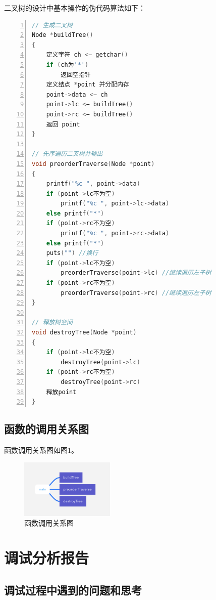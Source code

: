 \documentclass{article}
\begin{document}
二叉树的设计中基本操作的伪代码算法如下：

\begin{lstlisting}[language={C},
    numbers=left,
    numberstyle=\tiny\consolas,
    basicstyle=\small\consolas]
// 生成二叉树
Node *buildTree()
{
    定义字符 ch <− getchar()
    if (ch为'*')
        返回空指针
    定义结点 *point 并分配内存
    point->data <− ch
    point->lc <− buildTree()
    point->rc <− buildTree()
    返回 point
}
    
// 先序遍历二叉树并输出
void preorderTraverse(Node *point)
{
    printf("%c ", point->data)
    if (point->lc不为空)
        printf("%c ", point->lc->data)
    else printf("*")
    if (point->rc不为空)
        printf("%c ", point->rc->data)
    else printf("*")
    puts("") //换行
    if (point->lc不为空)
        preorderTraverse(point->lc) //继续遍历左子树
    if (point->rc不为空)
        preorderTraverse(point->rc) //继续遍历左子树
}

// 释放树空间
void destroyTree(Node *point)
{
    if (point->lc不为空)
        destroyTree(point->lc)
    if (point->rc不为空)
        destroyTree(point->rc)
    释放point
}
\end{lstlisting}

\subsection{函数的调用关系图}

函数调用关系图如图1。

\begin{figure}[htbp]

    \centering\includegraphics[width=0.4\textwidth]{./Images/pic4_1_1.png}

    \caption{函数调用关系图}

\end{figure}

\section{调试分析报告}

\subsection{调试过程中遇到的问题和思考}
\end{document}
